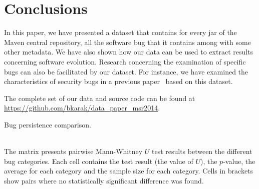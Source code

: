\documentclass{sig-alternate}
\begin{document}
\section{Conclusions}
\label{sec:conc}

In this paper, we have presented a dataset that contains
for every {\sc jar} of the Maven central repository,
all the software bug that it contains among with some
other metadata. We have also shown how our data can be
used to extract results concerning software evolution.
Research concerning the examination of specific bugs
can also be facilitated by our dataset. For instance,
we have examined the characteristics of security
bugs in a previous paper~\cite{MKLGS13}
based on this dataset.

The complete set of our data and source code
can be found at
\url{https://github.com/bkarak/data_paper_msr2014}.


  

\begin{landscape}
  \begin{table}
    \setlength{\extrarowheight}{0.10cm}
    \caption{Bug persistence comparison.}
    \label{tbl:bug_persistence}
    \resizebox{0.95\columnwidth}{!}{
    }\\
    The matrix presents pairwise Mann-Whitney $U$ test results
    between the different bug categories. Each cell contains the test
    result (the value of $U$), the $p$-value, the average for each
    category and the sample size for each category. Cells in brackets show
    pairs where no statistically significant difference was found.
  \end{table}
\end{landscape}
\end{document}
